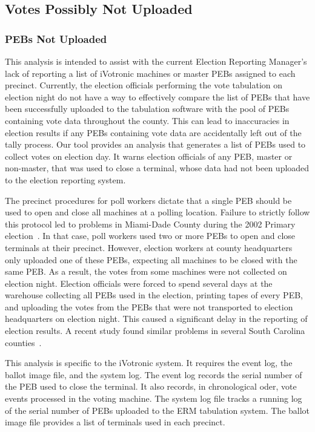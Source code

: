 \subsection{Votes Possibly Not Uploaded}
\subsubsection{PEBs Not Uploaded}
This analysis is intended to assist with the current Election Reporting Manager's lack of reporting  a list of iVotronic machines or master PEBs assigned to each precinct. Currently, the election officials performing the vote tabulation on election night do not have a way to effectively compare the list of PEBs that have been successfully uploaded to the tabulation software with the pool of PEBs containing vote data throughout the county. This can lead to inaccuracies in election results if any PEBs containing vote data are accidentally left out of the tally process. Our tool provides an analysis that generates a list of PEBs used to collect votes on election day. It warns election officials of any PEB, master or non-master, that was used to close a terminal, whose data had not been uploaded to the election reporting system.   

The precinct procedures for poll workers dictate that a single PEB should be used to open and close all machines at a polling location. Failure to strictly follow this protocol led to problems in Miami-Dade County during the 2002 Primary election~\cite{Mazella2002}. In that case, poll workers used two or more PEBs to open and close terminals at their precinct.  However, election workers at county headquarters only uploaded one of these PEBs, expecting all machines to be closed with the same PEB. As a result, the votes from some machines were not collected on election night.  Election officials were forced to spend several days at the warehouse collecting all PEBs used in the election, printing tapes of every PEB, and uploading the votes from the PEBs that were not transported to election headquarters on election night. This caused a significant delay in the reporting of election results. A recent study found similar problems in several South Carolina counties~\cite{Buell2011}.

This analysis is specific to the iVotronic system. It requires the event log, the ballot image file, and the system log. The event log records the serial number of the PEB used to close the terminal.  It also records, in chronological oder, vote events processed in the voting machine. The system log file tracks a running log of the serial number of PEBs uploaded to the ERM tabulation system. The ballot image file provides a list of terminals used in each precinct.


